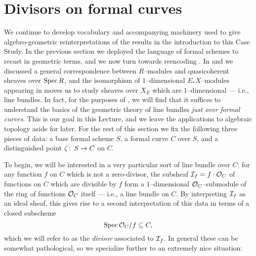 \section{Divisors on formal curves}\label{CurveDivisorsSection}


We continue to develop vocabulary and accompanying machinery used to give algebro-geometric reinterpretations of the results in the introduction to this Case Study.  In the previous section we deployed the language of formal schemes to recast  in geometric terms, and we now turn towards reencoding .  In  and  we discussed a general correspondence between $R$--modules and quasicoherent sheaves over $\operatorname{Spec} R$, and the isomorphism of $1$--dimensional $E_* X$--modules appearing in  moves us to study sheaves over $X_E$ which are $1$--dimensional --- i.e., line bundles.  In fact, for the purposes of , we will find that it suffices to understand the basics of the geometric theory of line bundles \emph{just over formal curves}.  This is our goal in this Lecture, and we leave the applications to algebraic topology aside for later.  For the rest of this section we fix the following three pieces of data: a base formal scheme $S$, a formal curve $C$ over $S$, and a distinguished point $\zeta\colon\thinspace S \to C$ on $C$.

To begin, we will be interested in a very particular sort of line bundle over $C$: for any function $f$ on $C$ which is not a zero-divisor, the subsheaf $\mathcal{I}_f = f \cdot \mathcal{O}_C$ of functions on $C$ which are divisible by $f$ form a $1$--dimensional $\mathcal{O}_C$--submodule of the ring of functions $\mathcal{O}_C$ itself --- i.e., a line bundle on $C$.  By interpreting $\mathcal{I}_f$ as an ideal sheaf, this gives rise to a second interpretation of this data in terms of a closed subscheme \[\operatorname{Spec} \mathcal{O}_C / f \subseteq C,\] which we will refer to as the \textit{divisor} associated to $\mathcal{I}_f$.  In general these can be somewhat pathological, so we specialize further to an extremely nice situation:

